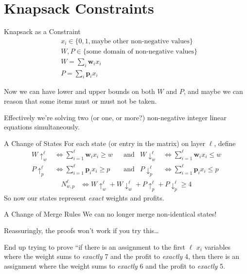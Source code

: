 \documentclass[aspectratio=169,compress,10pt]{beamer}
\begin{document}
\section{Knapsack Constraints}

\begin{frame}{Knapsack as a Constraint}
    \begin{align*}
        &x_i \in \{0, 1, \text{maybe other non-negative values}\}\\
        &W, P \in \{\text{some domain of non-negative values}\}\\
        &W = \sum_i \boldsymbol{w}_i x_i\\
        &P = \sum_i \boldsymbol{p}_i x_i
    \end{align*}

    Now we can have lower and upper bounds on both $W$ and $P$, and maybe we can reason that some
    items must or must not be taken.

    \medskip

    Effectively we're solving two (or one, or more?) non-negative integer linear equations simultaneously.
\end{frame}

\begin{frame}{A Change of States}
    For each state (or entry in the matrix) on layer $\ell$, define
    \begin{align*}
        W{\uparrow}^{\ell}_{w} &\Leftrightarrow \sum_{i=1}^{\ell} \boldsymbol{w}_i x_i \ge w
        &&\text{and}&
        W{\downarrow}^{\ell}_{w} &\Leftrightarrow \sum_{i=1}^{\ell} \boldsymbol{w}_i x_i \le w \\
        P{\uparrow}^{\ell}_{p} &\Leftrightarrow \sum_{i=1}^{\ell} \boldsymbol{p}_i x_i \ge p
        &&\text{and}&
        P{\downarrow}^{\ell}_{p} &\Leftrightarrow \sum_{i=1}^{\ell} \boldsymbol{p}_i x_i \le p
    \end{align*}\begin{align*}
        N^{\ell}_{w,p} & \Leftrightarrow W{\uparrow}^{\ell}_{w} + W{\downarrow}^{\ell}_{w} + P{\uparrow}^{\ell}_{p} + P{\downarrow}^{\ell}_{p} \ge 4
    \end{align*}
    So now our states represent \emph{exact} weights and profits.
\end{frame}

\begin{frame}{A Change of Merge Rules}
    We can no longer merge non-identical states!

    \bigskip

    Reassuringly, the proofs won't work if you try this\ldots

    \bigskip

    End up trying to prove ``if there is an assignment to the first $\ell$ $x_i$ variables where the weight sums to
    \emph{exactly} 7 and the profit to \emph{exactly} 4, then there is an assignment where the weight sums
    to \emph{exactly} 6 and the profit to \emph{exactly} 5.

\end{frame}
\end{document}

